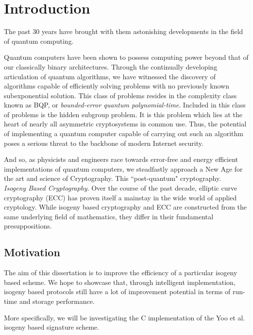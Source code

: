 \chapter{Introduction}

The past 30 years have brought with them astonishing developments in the field of quantum computing.

Quantum computers have been shown to possess computing power beyond that of our classically binary architectures. Through the continually developing articulation of quantum algorithms, we have witnessed the discovery of algorithms capable of efficiently solving problems with no previously known subexponential solution. This class of problems resides in the complexity class known as BQP, or \textit{bounded-error quantum polynomial-time}. Included in this class of problems is the hidden subgroup problem. It is this problem which lies at the heart of nearly all asymmetric cryptosystems in common use. Thus, the potential of implementing a quantum computer capable of carrying out such an algorithm poses a serious threat to the backbone of modern Internet security.  

And so, as physicists and engineers race towards error-free and energy efficient implementations of quantum computers, we steadfastly approach a New Age for the art and science of Cryptography. This ``post-quantum" cryptography.\\

\noindent
\textit{Isogeny Based Cryptography}. Over the course of the past decade, elliptic curve cryptography (ECC) has proven itself a mainstay in the wide world of applied cryptology. While isogeny based cryptography and ECC are constructed from the same underlying field of mathematics, they differ in their fundamental presuppositions.


\section{Motivation}
\label{sec:motivation}



The aim of this dissertation is to improve the efficiency of a particular isogeny based scheme. We hope to showcase that, through intelligent implementation, isogeny based protocols still have a lot of improvement potential in terms of run-time and storage performance. 

More specifically, we will be investigating the C implementation of the Yoo et al. isogeny based signature scheme. 

